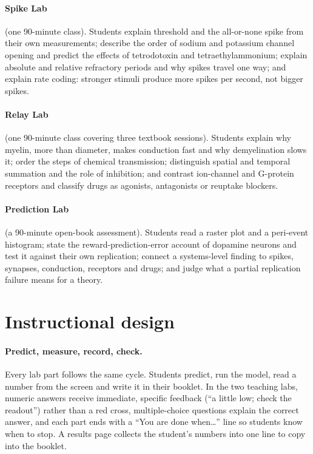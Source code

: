 \documentclass[11pt,a4paper]{article}
\begin{document}
\paragraph{Spike Lab} (one 90-minute class). Students explain threshold and the all-or-none spike from their own measurements; describe the order of sodium and potassium channel opening and predict the effects of tetrodotoxin and tetraethylammonium; explain absolute and relative refractory periods and why spikes travel one way; and explain rate coding: stronger stimuli produce more spikes per second, not bigger spikes.

\paragraph{Relay Lab} (one 90-minute class covering three textbook sessions). Students explain why myelin, more than diameter, makes conduction fast and why demyelination slows it; order the steps of chemical transmission; distinguish spatial and temporal summation and the role of inhibition; and contrast ion-channel and G-protein receptors and classify drugs as agonists, antagonists or reuptake blockers.

\paragraph{Prediction Lab} (a 90-minute open-book assessment). Students read a raster plot and a peri-event histogram; state the reward-prediction-error account of dopamine neurons and test it against their own replication; connect a systems-level finding to spikes, synapses, conduction, receptors and drugs; and judge what a partial replication failure means for a theory.

\section{Instructional design}

\paragraph{Predict, measure, record, check.} Every lab part follows the same cycle. Students predict, run the model, read a number from the screen and write it in their booklet. In the two teaching labs, numeric answers receive immediate, specific feedback (``a little low; check the readout'') rather than a red cross, multiple-choice questions explain the correct answer, and each part ends with a ``You are done when\ldots'' line so students know when to stop. A results page collects the student's numbers into one line to copy into the booklet.
\end{document}
